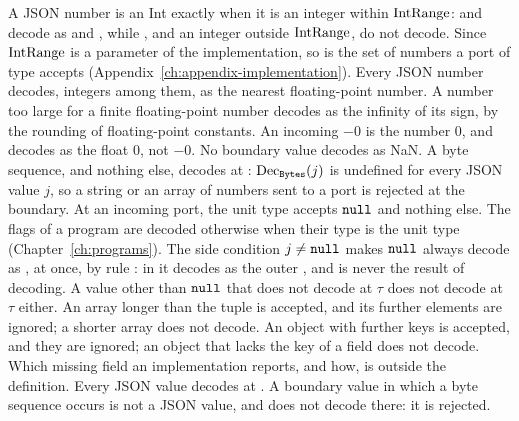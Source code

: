 \begin{rulecomments}
 A JSON number is an Int exactly when it is an integer
within $\mathrm{IntRange}$:  and  decode as  and , while
, and an integer outside $\mathrm{IntRange}$, do not decode. Since
$\mathrm{IntRange}$ is a parameter of the implementation, so is the set of numbers a
port of type  accepts (Appendix~\ref{ch:appendix-implementation}).
 Every JSON number decodes, integers among them, as
the nearest floating-point number. A number too large for a finite
floating-point number decodes as the infinity of its sign, by the rounding of
floating-point constants. An incoming $-0$ is the number $0$, and decodes as
the float $0$, not $-0$. No boundary value decodes as NaN. %
 A byte sequence, and nothing else, decodes at
: $\mathrm{Dec}_{\mathtt{Bytes}}(j)$ is undefined for every JSON value $j$, so a
string or an array of numbers sent to a  port is rejected at the
boundary. %
 At an incoming port, the unit type accepts
$\mathtt{null}$ and nothing else. The flags of a program are decoded otherwise
when their type is the unit type (Chapter~\ref{ch:programs}). %
 The side condition $j\neq\mathtt{null}$ makes
$\mathtt{null}$ always decode as , at once, by rule
: in  it decodes as the outer
, and  is never the result of decoding. A value
other than $\mathtt{null}$ that does not decode at $\tau$ does not decode at
 $\tau$ either.
 An array longer than the tuple is accepted, and its
further elements are ignored; a shorter array does not decode.
 An object with further keys is accepted, and they
are ignored; an object that lacks the key of a field does not decode. Which
missing field an implementation reports, and how, is outside the
definition. %
 Every JSON value decodes at .
A boundary value in which a byte sequence occurs is not a JSON value, and does
not decode there: it is rejected. %
\end{rulecomments}

